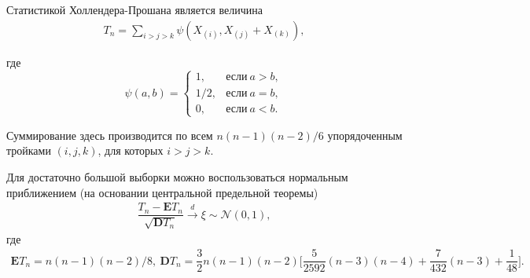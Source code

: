 \documentclass[%
	11pt,
	a4paper,
	utf8,
		]{article}
\begin{document}
Статистикой Холлендера-Прошана является величина \cite[182]{lagutin:2009}
\begin{align*}
	T_n = \sum_{i > j > k} \psi (X_{(i)}, X_{(j)} + X_{(k)}),
\end{align*}

где
$$
  \psi(a, b) = 
    \begin{cases}
    	1, &\text{если}\ a > b,\\
    	1/2, &\text{если}\ a = b,\\
    	0, &\text{если}\ a < b.
    \end{cases}
$$

Суммирование здесь производится по всем $ n(n-1)(n-2)/6 $ упорядоченным тройками $ (i, j, k) $, для которых $ i > j > k $.

Для достаточно большой выборки можно воспользоваться нормальным приближением (на основании центральной предельной теоремы)
\begin{align*}
	\dfrac{ T_n - \mathbf{E}T_n }{ \sqrt{\mathbf{D}T_n} } \xrightarrow{d} \xi \sim \mathcal{N}(0, 1),
\end{align*}
где
\begin{align*}
	\mathbf{E} T_n = n(n-1)(n-2)/8, \ 
	\mathbf{D} T_n = \dfrac{3}{2}n(n-1)(n-2)\Bigg[ \dfrac{5}{2592}(n - 3)(n - 4) + \dfrac{7}{432}(n - 3) + \dfrac{1}{48} \Bigg].
\end{align*}



\begin{thebibliography}{99}
	
	
\end{thebibliography}
\end{document}
